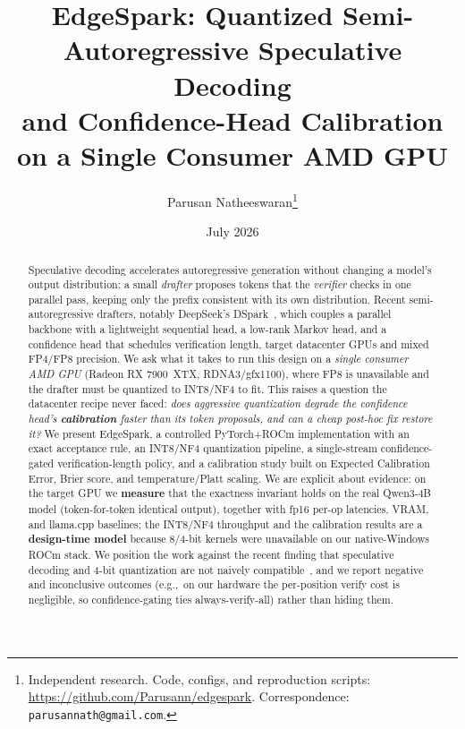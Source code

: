 \documentclass[11pt]{article}
\title{\bfseries EdgeSpark: Quantized Semi-Autoregressive Speculative Decoding\\
and Confidence-Head Calibration on a Single Consumer AMD GPU}
\author{Parusan Natheeswaran\thanks{Independent research. Code, configs, and
reproduction scripts: \url{https://github.com/Parusann/edgespark}. Correspondence:
\texttt{parusannath@gmail.com}.}}
\date{July 2026}
\theoremstyle{plain}
\theoremstyle{definition}
\newcommand{\eg}{e.g.,}
\begin{document}
\maketitle

\begin{abstract}
\noindent
Speculative decoding accelerates autoregressive generation without changing a
model's output distribution: a small \emph{drafter} proposes tokens that the
\emph{verifier} checks in one parallel pass, keeping only the prefix consistent
with its own distribution. Recent semi-autoregressive drafters, notably
DeepSeek's DSpark~\citep{dspark2026}, which couples a parallel backbone with a
lightweight sequential head, a low-rank Markov head, and a confidence head that
schedules verification length, target datacenter GPUs and mixed FP4/FP8
precision. We ask what it takes to run this design on a \emph{single consumer AMD
GPU} (Radeon RX 7900~XTX, RDNA3/gfx1100), where FP8 is unavailable and the
drafter must be quantized to INT8/NF4 to fit. This raises a question the
datacenter recipe never faced: \emph{does aggressive quantization degrade the
confidence head's \textbf{calibration} faster than its token proposals, and can a
cheap post-hoc fix restore it?} We present EdgeSpark, a controlled PyTorch+ROCm
implementation with an exact acceptance rule, an INT8/NF4 quantization pipeline,
a single-stream confidence-gated verification-length policy, and a calibration
study built on Expected Calibration Error, Brier score, and temperature/Platt
scaling. We are explicit about evidence: on the target GPU we \textbf{measure}
that the exactness invariant holds on the real Qwen3-4B model (token-for-token
identical output), together with fp16 per-op latencies, VRAM, and llama.cpp
baselines; the INT8/NF4 throughput and the calibration results are a
\textbf{design-time model} because 8/4-bit kernels were unavailable on our
native-Windows ROCm stack. We position the work against the recent finding that
speculative decoding and 4-bit quantization are not naively
compatible~\citep{zhang2025}, and we report negative and inconclusive outcomes
(\eg\ on our hardware the per-position verify cost is negligible, so
confidence-gating ties always-verify-all) rather than hiding them.
\end{abstract}

\end{document}
